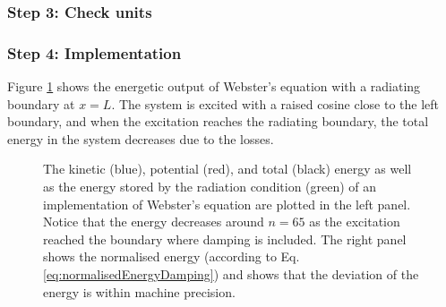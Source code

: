 {\subsubsection{Step 3: Check units}
\SWcomment[It seems like in order for the units to make sense, one must write Eq. \eqref{eq:webstersPDE} as
\begin{equation}
    \frac{S\rho}{c^2} \ptt\Psi = \frac{B}{c^2}\px(S(\px\Psi)),
\end{equation}
where $B$ is the bulk modulus of air (in N/m$^2$)]
\subsubsection{Step 4: Implementation}
Figure \ref{fig:energyWebsters} shows the energetic output of Webster's equation with a radiating boundary at $x=L$. The system is excited with a raised cosine close to the left boundary, and when the excitation reaches the radiating boundary, the total energy in the system decreases due to the losses.
\begin{figure}[h]
    \centering
      \caption{The kinetic (blue), potential (red), and total (black) energy as well as the energy stored by the radiation condition (green) of an implementation of Webster's equation are plotted in the left panel. Notice that the energy decreases around $n=65$ as the excitation reached the boundary where damping is included. The right panel shows the normalised energy (according to Eq. \eqref{eq:normalisedEnergyDamping}) and shows that the deviation of the energy is within machine precision. \label{fig:energyWebsters}}
\end{figure}

}

